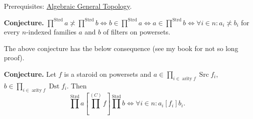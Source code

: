 \documentclass[12pt]{article}
\begin{document}
Prerequisites: \href{http://www.mathematics21.org/algebraic-general-topology.html}{Algebraic General Topology}.

{\bf Conjecture.} $\prod^{\operatorname{Strd}}a \not\asymp \prod^{\operatorname{Strd}}b \Leftrightarrow b\in\prod^{\operatorname{Strd}}a \Leftrightarrow a\in\prod^{\operatorname{Strd}}b \Leftrightarrow \forall i\in n: a_i\not\asymp b_i$ for every $n$-indexed families $a$ and $b$ of filters on powersets.

The above conjecture has the below consequence (see my book for not so long proof).

{\bf Conjecture.} Let $f$ is a staroid on powersets and $a\in \prod_{i\in\operatorname{arity}f}\operatorname{Src}f_i$, $b\in \prod_{i\in\operatorname{arity}f}\operatorname{Dst}f_i$. Then
\[ \prod^{\operatorname{Strd}}a \left[ \prod^{(C)}f \right] \prod^{\operatorname{Strd}}b \Leftrightarrow
\forall i\in n: a_i[f_i]b_i. \]
\end{document}
